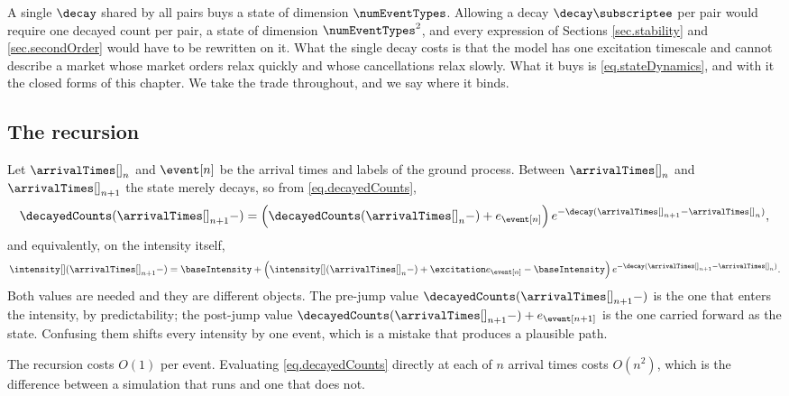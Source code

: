 \begin{remark}\label{remark.stateSize}
 A single $\decay$ shared by all pairs buys a state of dimension $\numEventTypes$.
 Allowing a decay $\decay\subscriptee$ per pair would require one decayed count per pair,
 a state of dimension $\numEventTypes^2$,
 and every expression of Sections \ref{sec.stability} and \ref{sec.secondOrder} would have to be
 rewritten on it.
 What the single decay costs is that the model has one excitation timescale and cannot describe
 a market whose market orders relax quickly and whose cancellations relax slowly.
 What it buys is \eqref{eq.stateDynamics}, and with it the closed forms of this chapter.
 We take the trade throughout, and we say where it binds.
\end{remark}

\subsection{The recursion}

Let $\arrivalTimes[ ]_{n}$ and $\event[n]$ be the arrival times and labels of the ground process.
Between $\arrivalTimes[ ]_{n}$ and $\arrivalTimes[ ]_{n+1}$ the state merely decays,
so from \eqref{eq.decayedCounts},
\begin{equation}\label{eq.update_of_exponential_intensity}
 \decayedCounts(\arrivalTimes[ ]_{n+1}-)
 = \Big( \decayedCounts(\arrivalTimes[ ]_{n}-) + e_{\event[n]} \Big)
 \, e^{-\decay (\arrivalTimes[ ]_{n+1} - \arrivalTimes[ ]_{n})},
\end{equation}
and equivalently, on the intensity itself,
\begin{equation*}
 \intensity[ ](\arrivalTimes[ ]_{n+1}-)
 = \baseIntensity
 + \Big( \intensity[ ](\arrivalTimes[ ]_{n}-) + \excitation e_{\event[n]} - \baseIntensity \Big)
 \, e^{-\decay (\arrivalTimes[ ]_{n+1} - \arrivalTimes[ ]_{n})}.
\end{equation*}
Both values are needed and they are different objects.
The pre-jump value $\decayedCounts(\arrivalTimes[ ]_{n+1}-)$ is the one that enters the
intensity, by predictability;
the post-jump value $\decayedCounts(\arrivalTimes[ ]_{n+1}-) + e_{\event[n+1]}$ is the one
carried forward as the state.
Confusing them shifts every intensity by one event, which is a mistake that produces a
plausible path.

The recursion costs $O(1)$ per event.
Evaluating \eqref{eq.decayedCounts} directly at each of $n$ arrival times costs $O(n^2)$,
which is the difference between a simulation that runs and one that does not.

